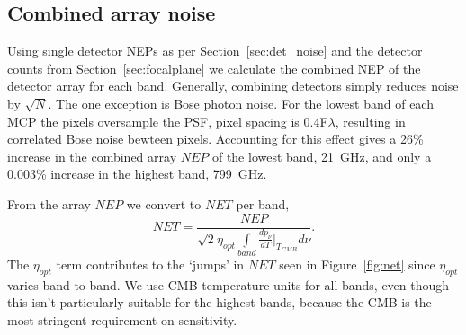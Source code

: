 \documentclass[]{spie}  %
\begin{document}

\subsection{Combined  array noise}

Using single detector NEPs as per Section~\ref{sec:det_noise} and the detector counts from Section~\ref{sec:focalplane} we 
calculate the combined NEP of the detector array for each band.  Generally, combining detectors simply reduces noise by $\sqrt{N}$.  The one 
exception is Bose photon noise. For the lowest band of each MCP the pixels oversample the PSF, pixel spacing is $0.4$F$\lambda$, resulting in correlated 
Bose noise bewteen pixels.  Accounting for this effect gives a 26\% increase in the combined array $NEP$ of the lowest band, 21~GHz, and only 
a 0.003\% increase in the highest band, 799~GHz.  

From the array $NEP$ we convert to $NET$ per band,
\begin{equation}
\label{eq:NET}
NET = \frac{NEP}{\sqrt{2}\eta_{opt} \int\limits_{band}\frac{dp_{\nu}}{dT}\Bigr|_{T_{CMB}} d\nu }.
\end{equation} 
The $\eta_{opt}$ term contributes to the `jumps' in $NET$ seen in Figure~\ref{fig:net} since $\eta_{opt}$ varies band to band.  We use CMB temperature 
units for all bands, even though this isn't particularly suitable for the highest bands, because the CMB is the most stringent requirement on sensitivity.
\end{document}
